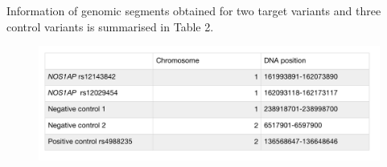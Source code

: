 \documentclass[a4paper,12pt,oneside]{extarticle}
\begin{document}
Information of genomic segments obtained for two target variants and three control variants is summarised in Table 2.

\begin{figure}[H] 
  \captionsetup{singlelinecheck = false, justification=justified}
  \centering
  \includegraphics[trim = 0 5mm 0 5mm, clip,width=1\textwidth]{table2.png}
\end{figure}
\end{document}
